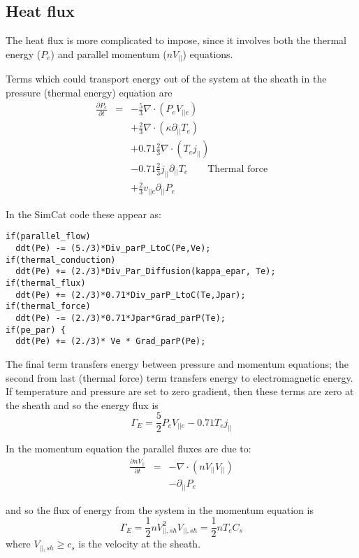 \documentclass[12pt,a4paper]{article}
\begin{document}
\subsection{Heat flux}

The heat flux is more complicated to impose, since it involves both the thermal energy ($P_e$) and parallel momentum ($nV_{||}$) equations.

Terms which could transport energy out of the system at the sheath in the pressure (thermal energy) equation are
\begin{eqnarray}
  \frac{\partial P_e}{\partial t} &=& -\frac{5}{3}\nabla\cdot\left(P_eV_{||e}\right) \\
  && + \frac{2}{3}\nabla\cdot\left(\kappa\partial_{||}T_e\right) \\
  && + 0.71 \frac{2}{3} \nabla\cdot\left(T_ej_{||}\right) \\
  && - 0.71 \frac{2}{3} j_{||} \partial_{||}T_e \qquad \textrm{Thermal force} \\
  && + \frac{2}{3} v_{||e}\partial_{||} P_e
\end{eqnarray}

In the SimCat code these appear as:
\begin{verbatim}
if(parallel_flow)
  ddt(Pe) -= (5./3)*Div_parP_LtoC(Pe,Ve);
if(thermal_conduction)
  ddt(Pe) += (2./3)*Div_Par_Diffusion(kappa_epar, Te);
if(thermal_flux)
  ddt(Pe) += (2./3)*0.71*Div_parP_LtoC(Te,Jpar);
if(thermal_force)
  ddt(Pe) -= (2./3)*0.71*Jpar*Grad_parP(Te);
if(pe_par) {
  ddt(Pe) += (2./3)* Ve * Grad_parP(Pe);
\end{verbatim}

The final term transfers energy between pressure and momentum equations; the second from last (thermal force) term transfers energy to electromagnetic energy. 
If temperature and pressure are set to zero gradient, then these terms are zero at the sheath and so the energy flux is
\begin{equation}
  \Gamma_E = \frac{5}{2}P_eV_{||e} - 0.71T_ej_{||}
\end{equation}

In the momentum equation the parallel fluxes are due to:
\begin{eqnarray}
  \frac{\partial nV_{||}}{\partial t} &=& -\nabla\cdot\left(nV_{||} V_{||}\right) \\
  && - \partial_{||}P_e
\end{eqnarray}

and so the flux of energy from the system in the momentum equation is
\begin{equation}
  \Gamma_E = \frac{1}{2} nV_{||,sh}^2V_{||,sh} = \frac{1}{2}nT_eC_s
\end{equation}
where $V_{||,sh} \ge c_s$ is the velocity at the sheath.
\end{document}
